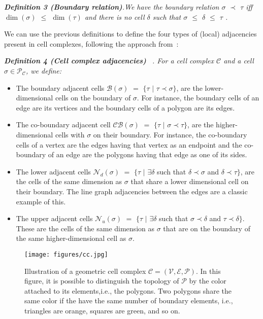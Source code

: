 \documentclass{article}
\begin{document}
\textit{\textbf{Definition 3 (Boundary relation)}.We have the boundary relation  $\sigma$ $\prec$ $\tau$ iff $\dim({\sigma})$ $\leq$ $\dim({\tau})$ and there is no cell $\delta$ such that
$\sigma$ $\leq$ $\delta$ $\leq$ $\tau$ .}


We can use the previous definitions to define the four types of (local) adjacencies present in cell complexes, following the approach from~\cite{bodnarcwnet}: 

\textit{\textbf{Definition 4 (Cell complex adjacencies) }~\cite{bodnarcwnet}. For a cell complex $\mathcal{C}$ and a cell $\sigma \in \mathcal{P}_{\mathcal{C}}$, we define: }

\begin{itemize}
    \item The boundary adjacent cells $\mathcal{B}(\sigma)$ $=$ $\{ \tau $ $|$ $\tau \prec \sigma \}$, are the lower-dimensional cells on the
boundary of $\sigma$. For instance, the boundary cells of an edge are its vertices and the boundary cells of a polygon are its edges.

    \item The co-boundary adjacent cell $\mathcal{CB}(\sigma)$ $=$ $\{\tau $  $|$ $  \sigma \prec \tau \}$, are the higher-dimensional cells with
    $\sigma$ on their boundary. For instance, the co-boundary cells of a vertex are the edges having that vertex as an endpoint and the co-boundary of an edge are the polygons having that edge as one of its sides. 
    
    \item The lower adjacent cells $\mathcal{N}_{d}(\sigma)$ $=$ $\{ \tau $ $|$ $ \exists \delta$ such that $\delta \prec \sigma$ and $\delta \prec \tau\}$, are the cells of
the same dimension as $\sigma$ that share a lower dimensional cell on their boundary. The line graph
adjacencies between the edges are a classic example of this.

     \item The upper adjacent cells $\mathcal{N}_{u}(\sigma)$ $=$ $\{ \tau $ $|$ $ \exists \delta$ such that $\sigma \prec \delta$ and $\tau \prec \delta\}$. These are the cells of
the same dimension as $\sigma$ that are on the boundary of the same higher-dimensional cell as $\sigma$. 
\end{itemize}

\begin{figure}[t]
    \centering
    \texttt{[image: figures/cc.jpg]}
    \caption{Illustration of a geometric cell complex $\mathcal{C} = (\mathcal{V}, \mathcal{E}, \mathcal{P})$. In this figure, it is possible to distinguish the topology of $\mathcal{P}$ by the color attached to its elements,i.e., the polygons. Two polygons share the same color if the have the same number of boundary elements, i.e., triangles are orange, squares are green, and so on.}
    \label{fig:cc}
\end{figure}
\end{document}
